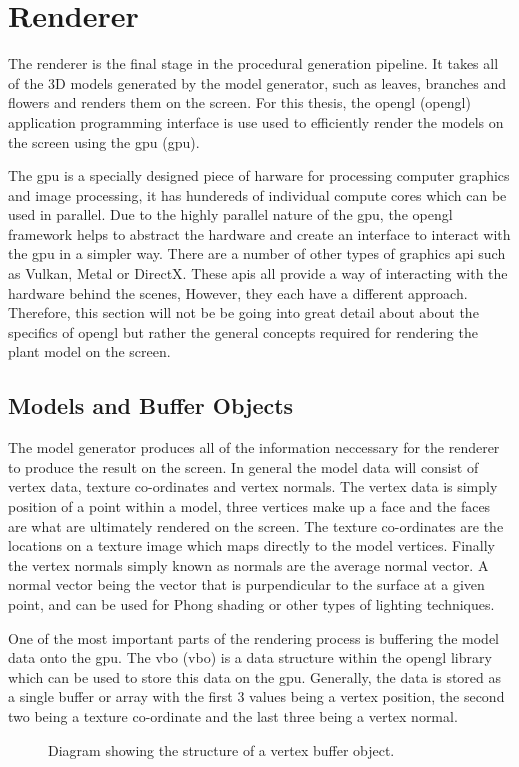 \section{Renderer}

The renderer is the final stage in the procedural generation pipeline. It takes all of the 3D models generated by the model generator, such as leaves, branches and flowers and renders them on the screen.  For this thesis, the \acrlong{opengl} (\acrshort{opengl}) application programming interface is use used to efficiently render the models on the screen using the \acrlong{gpu} (\acrshort{gpu}). 

The \acrshort{gpu} is a specially designed piece of harware for processing computer graphics and image processing, it has hundereds of individual compute cores which can be used in parallel. Due to the highly parallel nature of the \acrshort{gpu}, the \acrshort{opengl} framework helps to abstract the hardware and create an interface to interact with the \acrshort{gpu} in a simpler way. There are a number of other types of graphics \acrshort{api} such as Vulkan, Metal or DirectX. These \acrshort{api}s all provide a way of interacting with the hardware behind the scenes, However, they each have a different approach. Therefore, this section will not be be going into great detail about about the specifics of \acrshort{opengl} but rather the general concepts required for rendering the plant model on the screen.

\subsection{Models and Buffer Objects}

The model generator produces all of the information neccessary for the renderer to produce the result on the screen. In general the model data will consist of vertex data, texture co-ordinates and vertex normals. The vertex data is simply position of a point within a model, three vertices make up a face and the faces are what are ultimately rendered on the screen. The texture co-ordinates are the locations on a texture image which maps directly to the model vertices. Finally the vertex normals simply known as normals are the average normal vector. A normal vector being the vector that is purpendicular to the surface at a given point, and can be used for Phong shading or other types of lighting techniques.  

One of the most important parts of the rendering process is buffering the model data onto the \acrshort{gpu}. The \acrlong{vbo} (\acrshort{vbo}) is a data structure within the \acrshort{opengl} library which can be used to store this data on the \acrshort{gpu}. Generally, the data is stored as a single buffer or array with the first 3 values being a vertex position, the second two being a texture co-ordinate and the last three being a vertex normal. 

\begin{figure}[htbp]
	{\centering
		\vspace{7px}
		\setlength{\fboxrule}{1pt}
		\caption{Diagram showing the structure of a vertex buffer object.}
	}
\end{figure}
\FloatBarrier

 








